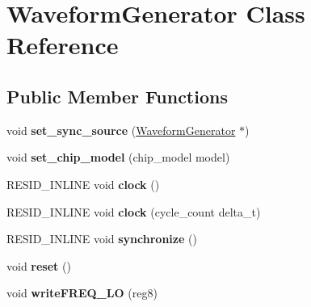 \hypertarget{classWaveformGenerator}{\section{Waveform\-Generator Class Reference}
\label{classWaveformGenerator}
}
\subsection*{Public Member Functions}
\begin{DoxyCompactItemize}
\item 
\hypertarget{classWaveformGenerator_a31234c031d93a16b6b87e97ccd5e7f88}{void {\bfseries set\-\_\-sync\-\_\-source} (\hyperlink{classWaveformGenerator}{Waveform\-Generator} $\ast$)}\label{classWaveformGenerator_a31234c031d93a16b6b87e97ccd5e7f88}

\item 
\hypertarget{classWaveformGenerator_a6d5cfeb65192a605e2dd14b292634685}{void {\bfseries set\-\_\-chip\-\_\-model} (chip\-\_\-model model)}\label{classWaveformGenerator_a6d5cfeb65192a605e2dd14b292634685}

\item 
\hypertarget{classWaveformGenerator_a3d507fb2d9898eb1bb977d65d300de79}{R\-E\-S\-I\-D\-\_\-\-I\-N\-L\-I\-N\-E void {\bfseries clock} ()}\label{classWaveformGenerator_a3d507fb2d9898eb1bb977d65d300de79}

\item 
\hypertarget{classWaveformGenerator_a9a6fba84b6748d7551b8d8ea06cc1c54}{R\-E\-S\-I\-D\-\_\-\-I\-N\-L\-I\-N\-E void {\bfseries clock} (cycle\-\_\-count delta\-\_\-t)}\label{classWaveformGenerator_a9a6fba84b6748d7551b8d8ea06cc1c54}

\item 
\hypertarget{classWaveformGenerator_a5ac654b0bac4711dbe90e76d78b27bd6}{R\-E\-S\-I\-D\-\_\-\-I\-N\-L\-I\-N\-E void {\bfseries synchronize} ()}\label{classWaveformGenerator_a5ac654b0bac4711dbe90e76d78b27bd6}

\item 
\hypertarget{classWaveformGenerator_ad27e46458a63aa1ac1b6992c4f016994}{void {\bfseries reset} ()}\label{classWaveformGenerator_ad27e46458a63aa1ac1b6992c4f016994}

\item 
\hypertarget{classWaveformGenerator_a380c9c6e9a8d37efe2413ab08acb2379}{void {\bfseries write\-F\-R\-E\-Q\-\_\-\-L\-O} (reg8)}\label{classWaveformGenerator_a380c9c6e9a8d37efe2413ab08acb2379}


\end{DoxyCompactItemize}
